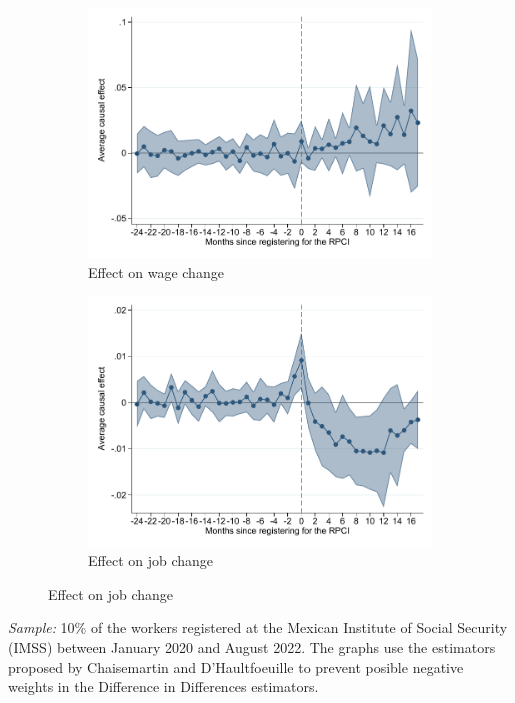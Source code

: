 \documentclass[oneside,11pt]{article}
\begin{document}
\clearpage

\begin{figure}[H]
    \ContinuedFloat
    \caption{(Continued) Event studies - RPCI effect}
    \label{event_study_cont}
    \begin{center}
    
    \begin{subfigure}{0.49\textwidth}
    \caption{Effect on wage change}
    \includegraphics[width=\textwidth]{04_Figures/muestra_10porciento/event_study_sal_diff_chaisemartin.pdf}
    \end{subfigure}
    \begin{subfigure}{0.49\textwidth}
    \caption{Effect on job change}
    \includegraphics[width=\textwidth]{04_Figures/muestra_10porciento/event_study_cambio_cierre_chaisemartin.pdf}
    \end{subfigure}

    \end{center}
\end{figure}
\scriptsize{
\noindent \textit{Sample:} 10\% of the workers registered at the Mexican Institute of Social Security (IMSS) between January 2020 and August 2022. The graphs use the estimators proposed by Chaisemartin and D'Haultfoeuille to prevent posible negative weights in the Difference in Differences estimators.
}
\end{document}
